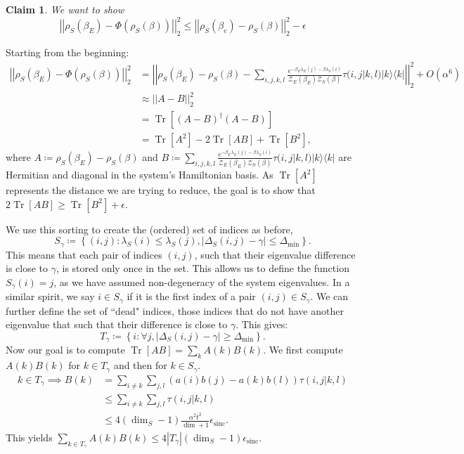 \documentclass{article}
\newtheorem{claim}[theorem]{Claim}
\newcommand{\ketbra}[2]{| #1\rangle\! \langle #2|}
\newcommand{\brackets}[1]{\left[ #1 \right]}
\newcommand{\norm}[1]{\left| \left| #1 \right| \right|}
\newcommand{\set}[1]{\left\{ #1 \right\}}
\newcommand{\bigo}[1]{O\left( #1 \right)}
\DeclareMathOperator{\Tr}{Tr}
\newcommand{\trace}[1]{\Tr \brackets{ #1 }}
\newcommand{\partfun}{\mathcal{Z}}
\DeclareMathOperator{\sinc}{sinc}
\begin{document}
\begin{claim}
We want to show
$$\norm{\rho_S(\beta_E) - \Phi(\rho_S(\beta))}_2^2 \leq \norm{\rho_S(\beta_e) - \rho_S(\beta)}_2^2 - \epsilon$$
\end{claim}

Starting from the beginning:
\begin{align}
    \norm{\rho_S(\beta_E) - \Phi(\rho_S(\beta))}_2^2 &= \norm{\rho_S(\beta_E) - \rho_S(\beta) - \sum_{i,j,k,l} \frac{e^{-\beta_E \lambda_E(j) - \beta \lambda_S(i)}}{\partfun_E(\beta_E) \partfun_S(\beta)} \tau(i,j|k,l) \ketbra{k}{k} }_2^2 + \bigo{\alpha^6} \\
    &\approx \norm{A - B}_2^2 \\
    &= \trace{(A - B)^\dagger (A - B)} \\
    &= \trace{A^2} - 2 \trace{A B} + \trace{B^2},
\end{align}
where $A \coloneqq \rho_S(\beta_E) - \rho_S(\beta)$ and $B \coloneqq \sum_{i,j,k,l} \frac{e^{-\beta_E \lambda_E(j) - \beta \lambda_S(i)}}{\partfun_E(\beta_E) \partfun_S(\beta)} \tau(i,j|k,l) \ketbra{k}{k} $ are Hermitian and diagonal in the system's Hamiltonian basis. As $\trace{A^2}$ represents the distance we are trying to reduce, the goal is to show that $2 \trace{AB} \geq \trace{B^2} + \epsilon$. 

We use this sorting to create the (ordered) set of indices as before,
\begin{equation}
    S_{\gamma} \coloneqq \set{(i,j) : \lambda_S(i) \leq \lambda_S(j), |\Delta_S(i,j) - \gamma| \leq \Delta_{\min}}.
\end{equation}
This means that each pair of indices $(i,j)$, such that their eigenvalue difference is close to $\gamma$, is stored only once in the set. This allows us to define the function $S_\gamma(i) = j$, as we have assumed non-degeneracy of the system eigenvalues. In a similar spirit, we say $i \in S_{\gamma}$ if it is the first index of a pair $(i,j) \in S_{\gamma}$. We can further define the set of ``dead" indices, those indices that do not have another eigenvalue that such that their difference is close to $\gamma$. This gives:
$$T_{\gamma} \coloneqq \set{i : \forall j, |\Delta_S(i,j) - \gamma| \geq \Delta_{\min}}.$$
Now our goal is to compute $\trace{A B} = \sum_{k} A(k) B(k)$. We first compute $A(k) B(k)$ for $k \in T_{\gamma}$ and then for $k \in S_{\gamma}$. 
\begin{align}
    k \in T_{\gamma} \implies B(k) &= \sum_{i \neq k} \sum_{j,l} (a(i) b(j) - a(k) b(l)) \tau(i,j|k,l) \\
    &\leq \sum_{i \neq k} \sum_{j,l} \tau(i,j|k,l) \\
    &\leq 4 (\dim_S - 1) \frac{\alpha^2 t^2}{\dim + 1}\epsilon_{\sinc}.
\end{align}
This yields $\sum_{k \in T_{\gamma}} A(k) B(k) \leq 4 |T_\gamma| (\dim_S - 1) \epsilon_{\sinc}$.
\end{document}
